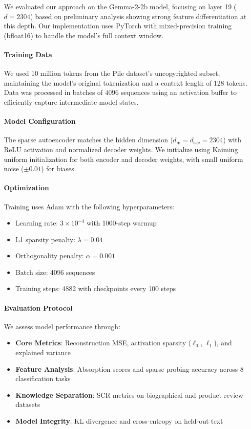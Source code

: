 \documentclass{article} %
\begin{document}
We evaluated our approach on the Gemma-2-2b model, focusing on layer 19 ($d=2304$) based on preliminary analysis showing strong feature differentiation at this depth. Our implementation uses PyTorch with mixed-precision training (bfloat16) to handle the model's full context window.

\paragraph{Training Data} We used 10 million tokens from the Pile dataset's uncopyrighted subset, maintaining the model's original tokenization and a context length of 128 tokens. Data was processed in batches of 4096 sequences using an activation buffer to efficiently capture intermediate model states.

\paragraph{Model Configuration} The sparse autoencoder matches the hidden dimension ($d_{\text{in}}=d_{\text{sae}}=2304$) with ReLU activation and normalized decoder weights. We initialize using Kaiming uniform initialization for both encoder and decoder weights, with small uniform noise ($\pm0.01$) for biases.

\paragraph{Optimization} Training uses Adam with the following hyperparameters:
\begin{itemize}
    \item Learning rate: $3 \times 10^{-4}$ with 1000-step warmup
    \item L1 sparsity penalty: $\lambda=0.04$
    \item Orthogonality penalty: $\alpha=0.001$
    \item Batch size: 4096 sequences
    \item Training steps: 4882 with checkpoints every 100 steps
\end{itemize}

\paragraph{Evaluation Protocol} We assess model performance through:
\begin{itemize}
    \item \textbf{Core Metrics}: Reconstruction MSE, activation sparsity ($\ell_0$, $\ell_1$), and explained variance
    \item \textbf{Feature Analysis}: Absorption scores and sparse probing accuracy across 8 classification tasks
    \item \textbf{Knowledge Separation}: SCR metrics on biographical and product review datasets
    \item \textbf{Model Integrity}: KL divergence and cross-entropy on held-out text
\end{itemize}
\end{document}
